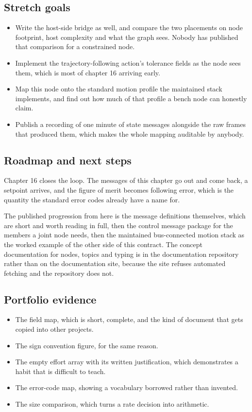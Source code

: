 \subsection*{Stretch goals}

\begin{itemize}
\item Write the host-side bridge as well, and compare the two placements on node
footprint, host complexity and what the graph sees. Nobody has published that
comparison for a constrained node.
\item Implement the trajectory-following action's tolerance fields as the node
sees them, which is most of chapter 16 arriving early.
\item Map this node onto the standard motion profile the maintained stack
implements, and find out how much of that profile a bench node can honestly
claim.
\item Publish a recording of one minute of state messages alongside the raw
frames that produced them, which makes the whole mapping auditable by anybody.
\end{itemize}

\subsection*{Roadmap and next steps}

Chapter 16 closes the loop. The messages of this chapter go out and come back, a
setpoint arrives, and the figure of merit becomes following error, which is the
quantity the standard error codes already have a name for.

The published progression from here is the message definitions themselves, which
are short and worth reading in full, then the control message package for the
members a joint node needs, then the maintained bus-connected motion stack as the
worked example of the other side of this contract. The concept documentation for
nodes, topics and typing is in the documentation repository rather than on the
documentation site, because the site refuses automated fetching and the
repository does not.

\subsection*{Portfolio evidence}

\begin{itemize}
\item The field map, which is short, complete, and the kind of document that
gets copied into other projects.
\item The sign convention figure, for the same reason.
\item The empty effort array with its written justification, which demonstrates
a habit that is difficult to teach.
\item The error-code map, showing a vocabulary borrowed rather than invented.
\item The size comparison, which turns a rate decision into arithmetic.
\end{itemize}

